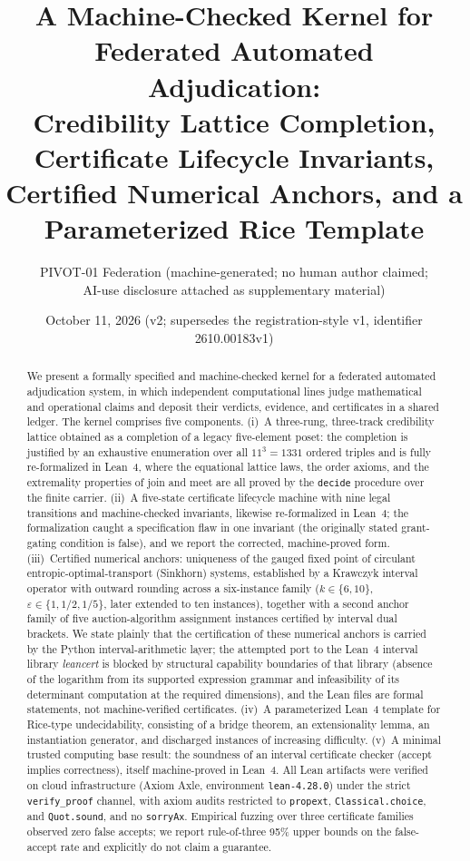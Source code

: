 \documentclass[11pt]{article}
\title{A Machine-Checked Kernel for Federated Automated Adjudication:\\
Credibility Lattice Completion, Certificate Lifecycle Invariants,\\
Certified Numerical Anchors, and a Parameterized Rice Template}
\author{PIVOT-01 Federation (machine-generated; no human author claimed;\\
AI-use disclosure attached as supplementary material)}
\date{October 11, 2026 (v2; supersedes the registration-style v1, identifier 2610.00183v1)}
\theoremstyle{definition}
\theoremstyle{remark}
\begin{document}
\maketitle

\begin{abstract}
We present a formally specified and machine-checked kernel for a federated
automated adjudication system, in which independent computational lines judge
mathematical and operational claims and deposit their verdicts, evidence, and
certificates in a shared ledger. The kernel comprises five components.
(i)~A three-rung, three-track credibility lattice obtained as a
completion of a legacy five-element poset: the completion is justified by an
exhaustive enumeration over all $11^{3}=1331$ ordered triples and is fully
re-formalized in Lean~4, where the equational lattice laws, the order axioms,
and the extremality properties of join and meet are all proved by the
\texttt{decide} procedure over the finite carrier.
(ii)~A five-state certificate lifecycle machine with nine legal transitions
and machine-checked invariants, likewise re-formalized in Lean~4; the
formalization caught a specification flaw in one invariant (the originally
stated grant-gating condition is false), and we report the corrected,
machine-proved form.
(iii)~Certified numerical anchors: uniqueness of the gauged fixed point of
circulant entropic-optimal-transport (Sinkhorn) systems, established by a
Krawczyk interval operator with outward rounding across a six-instance family
($k\in\{6,10\}$, $\varepsilon\in\{1,1/2,1/5\}$, later extended to ten
instances), together with a second anchor family of five auction-algorithm
assignment instances certified by interval dual brackets. We state plainly
that the certification of these numerical anchors is carried by the Python
interval-arithmetic layer; the attempted port to the Lean~4 interval library
\emph{leancert} is blocked by structural capability boundaries of that
library (absence of the logarithm from its supported expression grammar and
infeasibility of its determinant computation at the required dimensions),
and the Lean files are formal statements, not machine-verified certificates.
(iv)~A parameterized Lean~4 template for Rice-type undecidability, consisting
of a bridge theorem, an extensionality lemma, an instantiation generator, and
discharged instances of increasing difficulty.
(v)~A minimal trusted computing base result: the soundness of an interval
certificate checker (accept implies correctness), itself machine-proved in
Lean~4. All Lean artifacts were verified on cloud infrastructure (Axiom Axle,
environment \texttt{lean-4.28.0}) under the strict \texttt{verify\_proof}
channel, with axiom audits restricted to \texttt{propext},
\texttt{Classical.choice}, and \texttt{Quot.sound}, and no \texttt{sorryAx}.
Empirical fuzzing over three certificate families observed zero false
accepts; we report rule-of-three 95\% upper bounds on the false-accept rate
and explicitly do not claim a guarantee.
\end{abstract}
\end{document}
